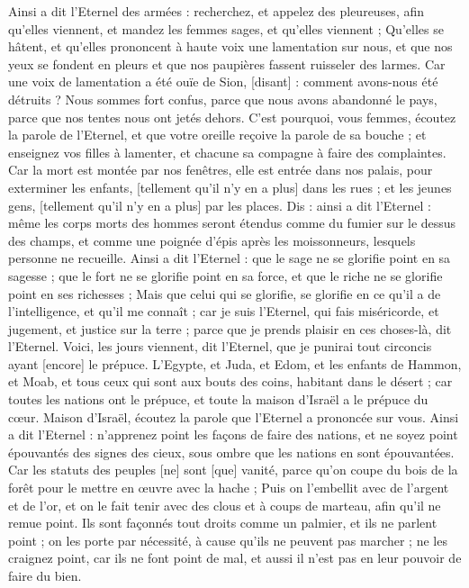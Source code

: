 \begin{multicols}{2}
Ainsi a dit l'Eternel des armées : recherchez, et appelez des pleureuses, afin qu'elles viennent, et mandez les femmes sages, et qu'elles viennent ;
Qu'elles se hâtent, et qu'elles prononcent à haute voix une lamentation sur nous, et que nos yeux se fondent en pleurs et que nos paupières fassent ruisseler des larmes.
Car une voix de lamentation a été ouïe de Sion, [disant] : comment avons-nous été détruits ? Nous sommes fort confus, parce que nous avons abandonné le pays, parce que nos tentes nous ont jetés dehors.
C'est pourquoi, vous femmes, écoutez la parole de l'Eternel, et que votre oreille reçoive la parole de sa bouche ; et enseignez vos filles à lamenter, et chacune sa compagne à faire des complaintes.
Car la mort est montée par nos fenêtres, elle est entrée dans nos palais, pour exterminer les enfants, [tellement qu'il n'y en a plus] dans les rues ; et les jeunes gens, [tellement qu'il n'y en a plus] par les places.
Dis : ainsi a dit l'Eternel : même les corps morts des hommes seront étendus comme du fumier sur le dessus des champs, et comme une poignée d'épis après les moissonneurs, lesquels personne ne recueille.
Ainsi a dit l'Eternel : que le sage ne se glorifie point en sa sagesse ; que le fort ne se glorifie point en sa force, et que le riche ne se glorifie point en ses richesses ;
Mais que celui qui se glorifie, se glorifie en ce qu'il a de l'intelligence, et qu'il me connaît ; car je suis l'Eternel, qui fais miséricorde, et jugement, et justice sur la terre ; parce que je prends plaisir en ces choses-là, dit l'Eternel.
Voici, les jours viennent, dit l'Eternel, que je punirai tout circoncis ayant [encore] le prépuce.
L'Egypte, et Juda, et Edom, et les enfants de Hammon, et Moab, et tous ceux qui sont aux bouts des coins, habitant dans le désert ; car toutes les nations ont le prépuce, et toute la maison d'Israël a le prépuce du cœur.
\VerseOne{}Maison d'Israël, écoutez la parole que l'Eternel a prononcée sur vous.
Ainsi a dit l'Eternel : n'apprenez point les façons de faire des nations, et ne soyez point épouvantés des signes des cieux, sous ombre que les nations en sont épouvantées.
Car les statuts des peuples [ne] sont [que] vanité, parce qu'on coupe du bois de la forêt pour le mettre en œuvre avec la hache ;
Puis on l'embellit avec de l'argent et de l'or, et on le fait tenir avec des clous et à coups de marteau, afin qu'il ne remue point.
Ils sont façonnés tout droits comme un palmier, et ils ne parlent point ; on les porte par nécessité, à cause qu'ils ne peuvent pas marcher ; ne les craignez point, car ils ne font point de mal, et aussi il n'est pas en leur pouvoir de faire du bien.

\end{multicols}
